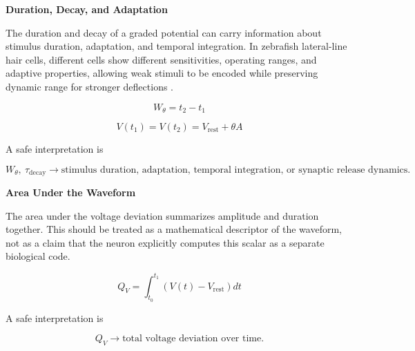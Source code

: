 \documentclass{book}
\providecommand{\ProjectDeepHeading}[2]{%
    \par\medskip\noindent\textbf{#2}\par\smallskip
}
\begin{document}
        \ProjectDeepHeading{13}{Duration, Decay, and Adaptation}
            
            The duration and decay of a graded potential can carry information about stimulus duration, adaptation, and temporal integration. In zebrafish lateral-line hair cells, different cells show different sensitivities, operating ranges, and adaptive properties, allowing weak stimuli to be encoded while preserving dynamic range for stronger deflections \citep{pichler-2019-the-transfer-characteristics-of-hair-cells-encoding-mechanical-stimuli-in-the-lateral-line-of-zebrafish}.
            
            \begin{equation}
                W_{\ensuremath{\theta}}
                =
                t_2-t_1
            \end{equation}
            
            \begin{equation}
                V(t_1)
                =
                V(t_2)
                =
                V_{\mathrm{rest}}+\ensuremath{\theta} A
            \end{equation}
            
            A safe interpretation is
            
            \begin{equation}
                W_{\ensuremath{\theta}},\ \ensuremath{\tau}_{\mathrm{decay}}
                \rightarrow
                \text{stimulus duration, adaptation, temporal integration, or synaptic release dynamics}.
            \end{equation}
        
        \ProjectDeepHeading{13}{Area Under the Waveform}
            
            The area under the voltage deviation summarizes amplitude and duration together. This should be treated as a mathematical descriptor of the waveform, not as a claim that the neuron explicitly computes this scalar as a separate biological code.
            
            \begin{equation}
                Q_V
                =
                \int_{t_0}^{t_1}
                \left(V(t)-V_{\mathrm{rest}}\right)
                dt
            \end{equation}
            
            A safe interpretation is
            
            \begin{equation}
                Q_V
                \rightarrow
                \text{total voltage deviation over time}.
            \end{equation}
        
\end{document}
